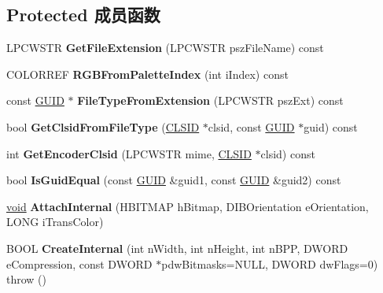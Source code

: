 \subsection*{Protected 成员函数}
\begin{DoxyCompactItemize}
\item 
\mbox{\label{class_a_t_l_1_1_c_image_ab927b31498d3a7e20e570c07f29e1b62}} 
L\+P\+C\+W\+S\+TR {\bfseries Get\+File\+Extension} (L\+P\+C\+W\+S\+TR psz\+File\+Name) const
\item 
\mbox{\label{class_a_t_l_1_1_c_image_ad345cab6a845d46f7f654c610d9b990a}} 
C\+O\+L\+O\+R\+R\+EF {\bfseries R\+G\+B\+From\+Palette\+Index} (int i\+Index) const
\item 
\mbox{\label{class_a_t_l_1_1_c_image_aaeafefe12c0e0b2dfc7119febbedc14c}} 
const \hyperlink{interface_g_u_i_d}{G\+U\+ID} $\ast$ {\bfseries File\+Type\+From\+Extension} (L\+P\+C\+W\+S\+TR psz\+Ext) const
\item 
\mbox{\label{class_a_t_l_1_1_c_image_a6c051cefca9b405c80042a4ef781736b}} 
bool {\bfseries Get\+Clsid\+From\+File\+Type} (\hyperlink{struct___i_i_d}{C\+L\+S\+ID} $\ast$clsid, const \hyperlink{interface_g_u_i_d}{G\+U\+ID} $\ast$guid) const
\item 
\mbox{\label{class_a_t_l_1_1_c_image_abed3027fd5ece1bd049fda556915eaf2}} 
int {\bfseries Get\+Encoder\+Clsid} (L\+P\+C\+W\+S\+TR mime, \hyperlink{struct___i_i_d}{C\+L\+S\+ID} $\ast$clsid) const
\item 
\mbox{\label{class_a_t_l_1_1_c_image_acad784c8b179cc7eee6324c7086eeebc}} 
bool {\bfseries Is\+Guid\+Equal} (const \hyperlink{interface_g_u_i_d}{G\+U\+ID} \&guid1, const \hyperlink{interface_g_u_i_d}{G\+U\+ID} \&guid2) const
\item 
\mbox{\label{class_a_t_l_1_1_c_image_abd281e14a315921024c6b44d6337e64a}} 
\hyperlink{interfacevoid}{void} {\bfseries Attach\+Internal} (H\+B\+I\+T\+M\+AP h\+Bitmap, D\+I\+B\+Orientation e\+Orientation, L\+O\+NG i\+Trans\+Color)
\item 
\mbox{\label{class_a_t_l_1_1_c_image_a67f40ab6c45d879a14844cf76a6f7b78}} 
B\+O\+OL {\bfseries Create\+Internal} (int n\+Width, int n\+Height, int n\+B\+PP, D\+W\+O\+RD e\+Compression, const D\+W\+O\+RD $\ast$pdw\+Bitmasks=N\+U\+LL, D\+W\+O\+RD dw\+Flags=0)  throw ()
\end{DoxyCompactItemize}

